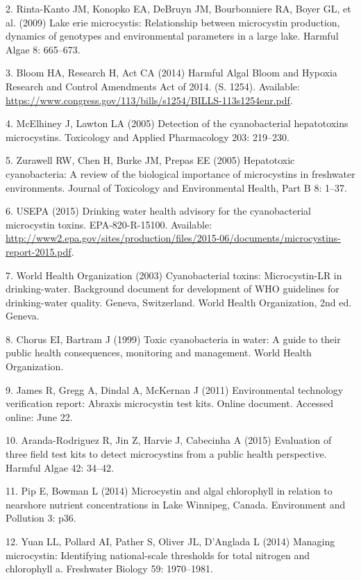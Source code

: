 \documentclass[11pt,]{article}
\begin{document}
2. Rinta-Kanto JM, Konopko EA, DeBruyn JM, Bourbonniere RA, Boyer GL, et
al. (2009) Lake erie microcystis: Relationship between microcystin
production, dynamics of genotypes and environmental parameters in a
large lake. Harmful Algae 8: 665--673.

3. Bloom HA, Research H, Act CA (2014) Harmful Algal Bloom and Hypoxia
Research and Control Amendments Act of 2014. (S. 1254). Available:
\url{https://www.congress.gov/113/bills/s1254/BILLS-113s1254enr.pdf}.

4. McElhiney J, Lawton LA (2005) Detection of the cyanobacterial
hepatotoxins microcystins. Toxicology and Applied Pharmacology 203:
219--230.

5. Zurawell RW, Chen H, Burke JM, Prepas EE (2005) Hepatotoxic
cyanobacteria: A review of the biological importance of microcystins in
freshwater environments. Journal of Toxicology and Environmental Health,
Part B 8: 1--37.

6. USEPA (2015) Drinking water health advisory for the cyanobacterial
microcystin toxins. EPA-820-R-15100. Available:
\url{http://www2.epa.gov/sites/production/files/2015-06/documents/microcystins-report-2015.pdf}.

7. World Health Organization (2003) Cyanobacterial toxins:
Microcystin-LR in drinking-water. Background document for development of
WHO guidelines for drinking-water quality. Geneva, Switzerland. World
Health Organization, 2nd ed. Geneva.

8. Chorus EI, Bartram J (1999) Toxic cyanobacteria in water: A guide to
their public health consequences, monitoring and management. World
Health Organization.

9. James R, Gregg A, Dindal A, McKernan J (2011) Environmental
technology verification report: Abraxis microcystin test kits. Online
document. Accessed online: June 22.

10. Aranda-Rodriguez R, Jin Z, Harvie J, Cabecinha A (2015) Evaluation
of three field test kits to detect microcystins from a public health
perspective. Harmful Algae 42: 34--42.

11. Pip E, Bowman L (2014) Microcystin and algal chlorophyll in relation
to nearshore nutrient concentrations in Lake Winnipeg, Canada.
Environment and Pollution 3: p36.

12. Yuan LL, Pollard AI, Pather S, Oliver JL, D'Anglada L (2014)
Managing microcystin: Identifying national-scale thresholds for total
nitrogen and chlorophyll a. Freshwater Biology 59: 1970--1981.
\end{document}
